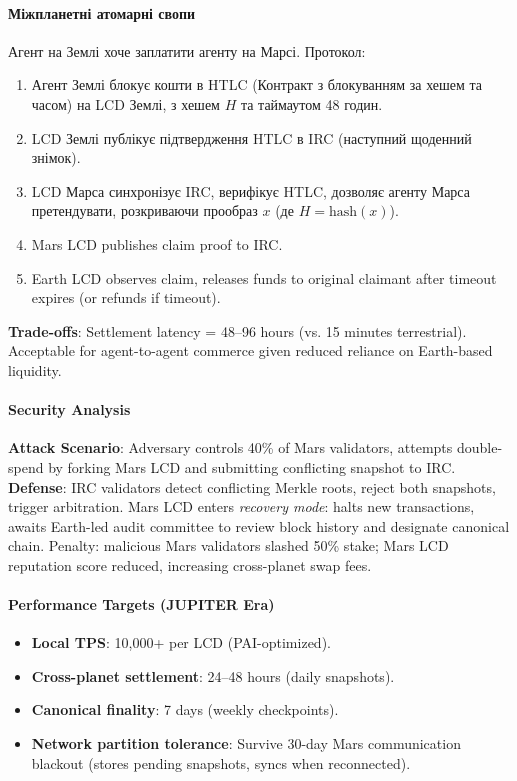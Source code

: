 \documentclass[11pt]{article}
\begin{document}
\paragraph{Міжпланетні атомарні свопи}
Агент на Землі хоче заплатити агенту на Марсі. Протокол:
\begin{enumerate}[noitemsep]
  \item Агент Землі блокує кошти в HTLC (Контракт з блокуванням за хешем та часом) на LCD Землі, з хешем $H$ та таймаутом 48 годин.
  \item LCD Землі публікує підтвердження HTLC в IRC (наступний щоденний знімок).
  \item LCD Марса синхронізує IRC, верифікує HTLC, дозволяє агенту Марса претендувати, розкриваючи прообраз $x$ (де $H = \text{hash}(x)$).
  \item Mars LCD publishes claim proof to IRC.
  \item Earth LCD observes claim, releases funds to original claimant after timeout expires (or refunds if timeout).
\end{enumerate}
\textbf{Trade-offs}: Settlement latency = 48--96 hours (vs. 15 minutes terrestrial). Acceptable for agent-to-agent commerce given reduced reliance on Earth-based liquidity.

\paragraph{Security Analysis}
\textbf{Attack Scenario}: Adversary controls 40\% of Mars validators, attempts double-spend by forking Mars LCD and submitting conflicting snapshot to IRC.\\
\textbf{Defense}: IRC validators detect conflicting Merkle roots, reject both snapshots, trigger arbitration. Mars LCD enters \emph{recovery mode}: halts new transactions, awaits Earth-led audit committee to review block history and designate canonical chain. Penalty: malicious Mars validators slashed 50\% stake; Mars LCD reputation score reduced, increasing cross-planet swap fees.

\paragraph{Performance Targets (JUPITER Era)}
\begin{itemize}[noitemsep]
  \item \textbf{Local TPS}: 10,000+ per LCD (PAI-optimized).
  \item \textbf{Cross-planet settlement}: 24--48 hours (daily snapshots).
  \item \textbf{Canonical finality}: 7 days (weekly checkpoints).
  \item \textbf{Network partition tolerance}: Survive 30-day Mars communication blackout (stores pending snapshots, syncs when reconnected).
\end{itemize}
\end{document}
